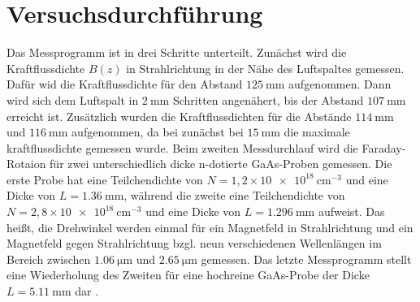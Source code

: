 \section{Versuchsdurchführung}
\label{sec:Versuchsdurchführung}

Das Messprogramm ist in drei Schritte unterteilt.
Zunächst wird die Kraftflussdichte $B(z)$ in Strahlrichtung in der Nähe des 
Luftspaltes gemessen. Dafür wid die Kraftflussdichte für den Abstand $\SI{125}{\milli\meter}$
aufgenommen. Dann wird sich dem Luftspalt in $\SI{2}{\milli\meter}$ Schritten 
angenähert, bis der Abstand $\SI{107}{\milli\meter}$ erreicht ist. 
Zusätzlich wurden die Kraftflussdichten für die Abstände $\SI{114}{\milli\meter}$
und $\SI{116}{\milli\meter}$ aufgenommen, da bei zunächst bei $\SI{15}{\milli\meter}$
die maximale kraftflussdichte gemessen wurde.
Beim zweiten Messdurchlauf wird die Faraday-Rotaion für zwei unterschiedlich dicke 
n-dotierte GaAs-Proben gemessen. 
Die erste Probe hat eine Teilchendichte von $N = 1,2 \times \SI{10e18}{\centi\meter^{-3}}$ 
und eine Dicke von $L = \SI{1,36}{\milli\meter}$, während die zweite eine 
Teilchendichte von $N = 2,8 \times \SI{10e18}{\centi\meter^{-3}}$ 
und eine Dicke von $L = \SI{1,296}{\milli\meter}$ aufweist.
Das heißt, die Drehwinkel werden einmal für ein 
Magnetfeld in Strahlrichtung und ein Magnetfeld gegen Strahlrichtung bzgl. neun 
verschiedenen Wellenlängen im Bereich zwischen $\SI{1,06}{\micro\meter}$ 
und $\SI{2,65}{\micro\meter}$ gemessen.
Das letzte Messprogramm stellt eine Wiederholung des Zweiten für eine hochreine 
GaAs-Probe der Dicke $L = \SI{5,11}{\milli\meter}$ dar \cite{sample}.